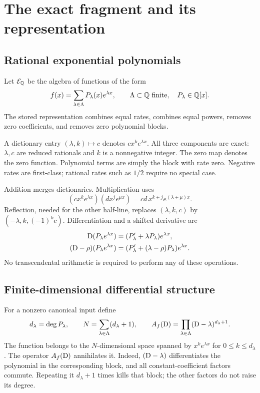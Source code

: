 \section{The exact fragment and its representation}
\label{sec:representation}

\subsection{Rational exponential polynomials}

\begin{definition}
Let $\mathcal E_{\mathbb Q}$ be the algebra of functions of the form
\begin{equation}
 f(x)=\sum_{\lambda\in\Lambda}P_\lambda(x)e^{\lambda x},
 \qquad \Lambda\subset\mathbb Q\text{ finite},\quad P_\lambda\in\mathbb Q[x].
 \label{eq:fragment}
\end{equation}
The stored representation combines equal rates, combines equal powers, removes
zero coefficients, and removes zero polynomial blocks.
\end{definition}

A dictionary entry $(\lambda,k)\mapsto c$ denotes $cx^ke^{\lambda x}$.
All three components are exact: $\lambda,c$ are reduced rationals and $k$ is a
nonnegative integer. The zero map denotes the zero function. Polynomial terms
are simply the block with rate zero. Negative rates are first-class; rational
rates such as $1/2$ require no special case.

Addition merges dictionaries. Multiplication uses
\[
 (c x^k e^{\lambda x})(d x^j e^{\mu x})
   =cd\,x^{k+j}e^{(\lambda+\mu)x}.
\]
Reflection, needed for the other half-line, replaces $(\lambda,k,c)$ by
$(-\lambda,k,(-1)^kc)$. Differentiation and a shifted derivative are
\begin{align}
 \mathrm D(P_\lambda e^{\lambda x})
   &=(P_\lambda'+\lambda P_\lambda)e^{\lambda x},\\
 (\mathrm D-\rho)(P_\lambda e^{\lambda x})
   &=(P_\lambda'+(\lambda-\rho)P_\lambda)e^{\lambda x}.
 \label{eq:shifted-derivative}
\end{align}
No transcendental arithmetic is required to perform any of these operations.

\subsection{Finite-dimensional differential structure}

For a nonzero canonical input define
\[
 d_\lambda=\deg P_\lambda,\qquad
 N=\sum_{\lambda\in\Lambda}(d_\lambda+1),\qquad
 A_f(\mathrm D)=\prod_{\lambda\in\Lambda}(\mathrm D-\lambda)^{d_\lambda+1}.
\]
The function belongs to the $N$-dimensional space spanned by
$x^ke^{\lambda x}$ for $0\le k\le d_\lambda$. The operator $A_f(\mathrm D)$ annihilates
it. Indeed, $(\mathrm D-\lambda)$ differentiates the polynomial in the corresponding
block, and all constant-coefficient factors commute. Repeating it $d_\lambda+1$
times kills that block; the other factors do not raise its degree.

